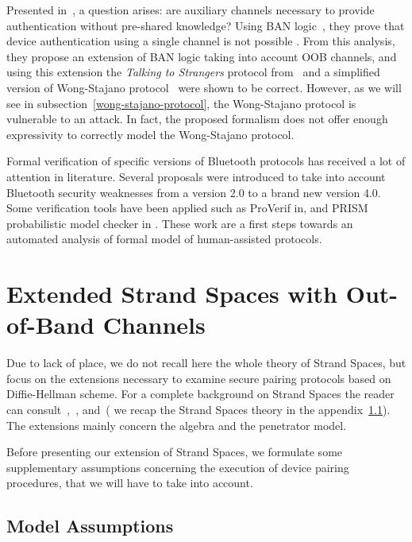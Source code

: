 Presented in~\cite{jisis11-1-1-07}, a question arises: are auxiliary channels necessary to provide authentication without pre-shared knowledge? Using BAN logic~\cite{Burrows90alogic}, they prove that device authentication using a single channel is not possible . From this analysis, they propose an extension of BAN logic taking into account OOB channels, and using this extension the \textit{Talking to Strangers} protocol from~\cite{Smetters02talkingto} and a simplified version of Wong-Stajano protocol~\cite{10.1109/MPRV.2007.76} were shown to be correct. However, as we will see in subsection~\ref{wong-stajano-protocol}, the Wong-Stajano protocol is vulnerable to an attack. In fact, the proposed formalism does not offer enough expressivity to correctly model the Wong-Stajano protocol.
 
Formal verification of specific versions of Bluetooth protocols has received a lot of attention in literature. Several proposals were introduced to take into account Bluetooth security weaknesses from a version 2.0 to a brand new version 4.0. Some verification tools have been applied such as ProVerif in\cite{Chang_formalanalysis}, and PRISM probabilistic model checker in \cite{Duflot:2006rm}. These work are a first steps towards an automated analysis of formal model of human-assisted protocols. 

\section{Extended Strand Spaces with Out-of-Band Channels}\label{extended-strand}

Due to lack of place, we do not recall here the whole theory of Strand Spaces, but focus on the extensions necessary to examine secure pairing protocols based on Diffie-Hellman scheme. For a complete background on Strand Spaces the reader can consult~\cite{674832},~\cite{Guttman:2002:ATS:568264.568267}, and~\cite{1212716}( we recap the Strand Spaces theory in the appendix~\ref{}). The extensions mainly concern the algebra and the penetrator model.

Before presenting our extension of Strand Spaces, we formulate some supplementary assumptions concerning the execution of device pairing procedures, that we will have to take into account.
 
\subsection{Model Assumptions}

